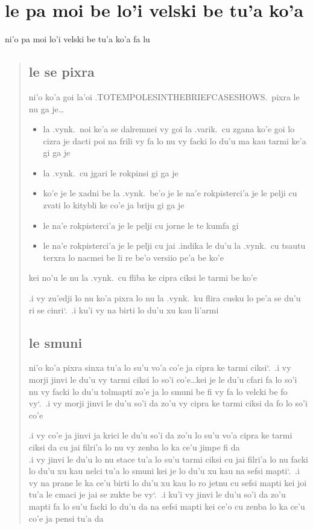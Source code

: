 \documentclass{report}
\newcommand\sds{\spacefactor\sfcode`.\ \space}
\begin{document}
\section{le pa moi be lo'i velski be tu'a ko'a}
ni'o pa moi lo'i velski be tu'a ko'a fa lu

\begin{quote}
	\subsection{le se pixra}
	ni'o ko'a goi la'oi .TOTEMPOLESINTHEBRIEFCASESHOWS.\ pixra le nu ga je\ldots
	\begin{itemize}
		\item la .vynk.\ noi ke'a se dalremnei vy goi la .varik.\ cu zgana ko'e goi lo cizra je dacti poi na frili vy fa lo nu vy facki lo du'u ma kau tarmi ke'a gi ga je
		\item la .vynk.\ cu jgari le rokpinsi gi ga je
		\item ko'e je le xadni be la .vynk.\ be'o je le na'e rokpisterci'a je le pelji cu zvati lo kitybli ke co'e ja briju gi ga je
		\item le na'e rokpisterci'a je le pelji cu jorne le te kumfa gi
		\item le na'e rokpisterci'a je le pelji cu jai .indika le du'u la .vynk.\ cu tsautu terxra lo nacmei be li re be'o versiio pe'a be ko'e
	\end{itemize}

	kei no'u le nu la .vynk.\ cu fliba ke cipra ciksi le tarmi be ko'e

	.i vy zu'edji lo nu ko'a pixra lo nu la .vynk.\ ku flira cusku lo pe'a se du'u ri se cinri\sds  .i ku'i vy na birti lo du'u xu kau li'armi

	\subsection{le smuni}
	ni'o ko'a pixra sinxa tu'a lo su'u vo'a co'e ja cipra ke tarmi ciksi\sds  .i vy morji jinvi le du'u vy tarmi ciksi lo so'i co'e\ldots kei je le du'u cfari fa lo so'i nu vy facki lo du'u tolmapti zo'e ja lo smuni be fi vy fa lo velcki be fo vy\sds  .i vy morji jinvi le du'u so'i da zo'u vy cipra ke tarmi ciksi da fo lo so'i co'e

	.i vy co'e ja jinvi ja krici le du'u so'i da zo'u lo su'u vo'a cipra ke tarmi ciksi da cu jai filri'a lo nu vy zenba lo ka ce'u jimpe fi da\\
	.i vy jinvi le du'u lo nu stace tu'a lo su'u tarmi ciksi cu jai filri'a lo nu facki lo du'u xu kau nelci tu'a lo smuni kei je lo du'u xu kau na sefsi mapti\sds  .i vy na prane le ka ce'u birti lo du'u xu kau lo ro jetnu cu sefsi mapti kei joi tu'a le cmaci je jai se zukte be vy\sds  .i ku'i vy jinvi le du'u so'i da zo'u mapti fa lo su'u facki lo du'u da na sefsi mapti kei ce'o cu zenba lo ka ce'u co'e ja pensi tu'a da


\end{quote}
\end{document}
